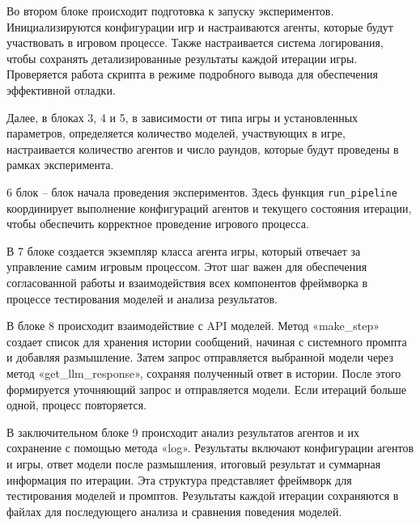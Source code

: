 Во втором блоке происходит подготовка к запуску экспериментов. Инициализируются конфигурации игр и настраиваются агенты, которые будут участвовать в игровом процессе. Также настраивается система логирования, чтобы сохранять детализированные результаты каждой итерации игры. Проверяется работа скрипта в режиме подробного вывода для обеспечения эффективной отладки.

Далее, в блоках 3, 4 и 5, в зависимости от типа игры и установленных параметров, определяется количество моделей, участвующих в игре, настраивается количество агентов и число раундов, которые будут проведены в рамках эксперимента.

6 блок -- блок начала проведения экспериментов. Здесь функция \texttt{run\_pipeline} координирует выполнение конфигураций агентов и текущего состояния итерации, чтобы обеспечить корректное проведение игрового процесса.

В 7 блоке создается экземпляр класса агента игры, который отвечает за управление самим игровым процессом. Этот шаг важен для обеспечения согласованной работы и взаимодействия всех компонентов фреймворка в процессе тестирования моделей и анализа результатов.

В блоке 8 происходит взаимодействие с API моделей. Метод «make\_step» создает список для хранения истории сообщений, начиная с системного промпта и добавляя размышление. Затем запрос отправляется выбранной модели через метод «get\_llm\_response», сохраняя полученный ответ в истории. После этого формируется уточняющий запрос и отправляется модели. Если итераций больше одной, процесс повторяется.

В заключительном блоке 9 происходит анализ результатов агентов и их сохранение с помощью метода «log». Результаты включают конфигурации агентов и игры, ответ модели после размышления, итоговый результат и суммарная информация по итерации. Эта структура представляет фреймворк для тестирования моделей и промптов. Результаты каждой итерации сохраняются в файлах для последующего анализа и сравнения поведения моделей.

\FloatBarrier
